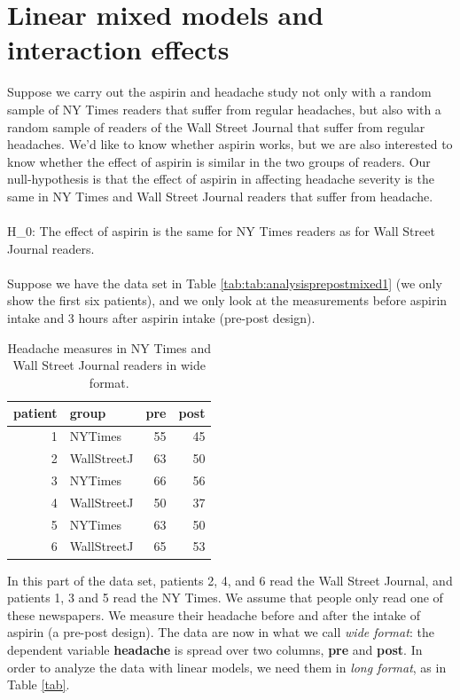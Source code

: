 \documentclass[]{book}\usepackage[]{graphicx}\usepackage[]{color}
\begin{document}
\section{Linear mixed models and interaction effects}


Suppose we carry out the aspirin and headache study not only with a random sample of NY Times readers that suffer from regular headaches, but also with a random sample of readers of the Wall Street Journal that suffer from regular headaches. We'd like to know whether aspirin works, but we are also interested to know whether the effect of aspirin is similar in the two groups of readers. Our null-hypothesis is that the effect of aspirin in affecting headache severity is the same in NY Times and Wall Street Journal readers that suffer from headache.\\
\\
H\_0: The effect of aspirin is the same for NY Times readers as for Wall Street Journal readers.
\\
\\
Suppose we have the data set in Table \ref{tab:tab:analysisprepostmixed1} (we only show the first six patients), and we only look at the measurements before aspirin intake and 3 hours after aspirin intake (pre-post design). 

\begin{table}[ht]
\centering
\caption{Headache measures in NY Times and Wall Street Journal readers in wide format.} 
\label{tab:analysisprepostmixed1}
\begin{tabular}{rlrr}
  \hline
patient & group & pre & post \\ 
  \hline
1 & NYTimes & 55 & 45 \\ 
  2 & WallStreetJ & 63 & 50 \\ 
  3 & NYTimes & 66 & 56 \\ 
  4 & WallStreetJ & 50 & 37 \\ 
  5 & NYTimes & 63 & 50 \\ 
  6 & WallStreetJ & 65 & 53 \\ 
   \hline
\end{tabular}
\end{table}




In this part of the data set, patients 2, 4, and 6 read the Wall Street Journal, and patients 1, 3 and 5 read the NY Times. We assume that people only read one of these newspapers. We measure their headache before and after the intake of aspirin (a pre-post design). The data are now in what we call \textit{wide format}: the dependent variable \textbf{headache} is spread over two columns, \textbf{pre} and \textbf{post}. In order to analyze the data with linear models, we need them in \textit{long format}, as in Table \ref{tab}. 
\end{document}
